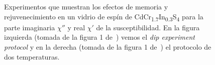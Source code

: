 \documentclass[11pt]{report}
\begin{document}
\begin{figure}

    \caption{Experimentos que muestran los efectos de memoria y
      rejuvenecimiento en un vidrio de espín de
      CdCr\textsubscript{1.7}In\textsubscript{0.3}S\textsubscript{4}
      para la parte imaginaria $χ''$ y real $χ'$ de la
      susceptibilidad. En la figura izquierda (tomada de la figura 1
      de~\cite{dippaper}) vemos el \textit{dip experiment protocol} y en la
      derecha (tomada de la figura 1 de~\cite{threeprotocolpaper})
      el protocolo de dos temperaturas.}
  \label{fig:experimental}
\end{figure}
\end{document}
